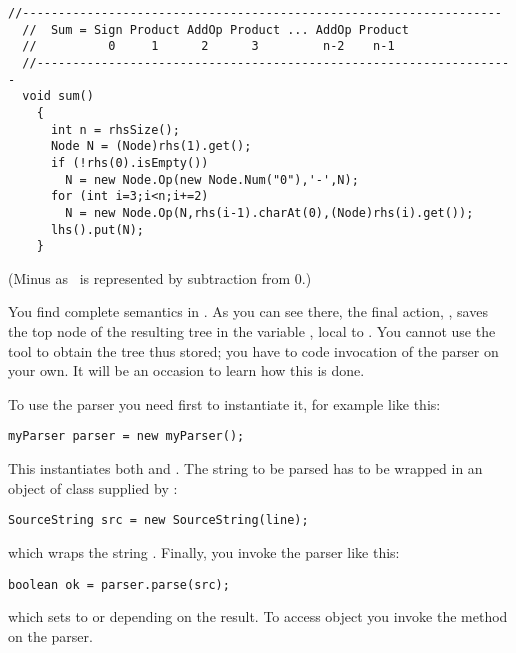 \small
\begin{Verbatim}[frame=single,framesep=2mm,samepage=true,xleftmargin=15mm,xrightmargin=15mm,baselinestretch=0.8]
  //-------------------------------------------------------------------
  //  Sum = Sign Product AddOp Product ... AddOp Product
  //          0     1      2      3         n-2    n-1
  //-------------------------------------------------------------------
  void sum()
    {
      int n = rhsSize();
      Node N = (Node)rhs(1).get();
      if (!rhs(0).isEmpty())
        N = new Node.Op(new Node.Num("0"),'-',N);
      for (int i=3;i<n;i+=2)
        N = new Node.Op(N,rhs(i-1).charAt(0),(Node)rhs(i).get());
      lhs().put(N);
    }
\end{Verbatim}
\normalsize

(Minus as \Sign\ is represented by subtraction from 0.)

You find complete semantics in .
As you can see there, the final action, ,
saves the top node of the resulting tree in the variable ,
local to .
You cannot use the tool  to obtain the 
tree thus stored;
you have to code invocation of the parser on your own.
It will be an occasion to learn how this is done.

To use the parser you need first to instantiate it, for example like this:
\small
\begin{Verbatim}[samepage=true,xleftmargin=15mm,baselinestretch=0.8]
myParser parser = new myParser();
\end{Verbatim}
\normalsize

This instantiates both  and .
The string to be parsed has to be wrapped in an object of class  supplied by \Mouse:

\small
\begin{Verbatim}[samepage=true,xleftmargin=15mm,baselinestretch=0.8]
SourceString src = new SourceString(line);
\end{Verbatim}
\normalsize

which wraps the string .
Finally, you invoke the parser like this:

\small
\begin{Verbatim}[samepage=true,xleftmargin=15mm,baselinestretch=0.8]
boolean ok = parser.parse(src);
\end{Verbatim}
\normalsize

which sets  to  or  depending on the result.
To access  object you invoke the method  
on the parser.


